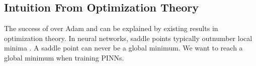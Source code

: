 




\subsection{Intuition From Optimization Theory}
The success of \al{} over Adam and \lbfgs{} can be explained by existing results in optimization theory.
In neural networks, saddle points typically outnumber local minima \cite{dauphin2014identifying,lee2019firstorder}.
A saddle point can never be a global minimum. 
We want to reach a global minimum when training PINNs.

